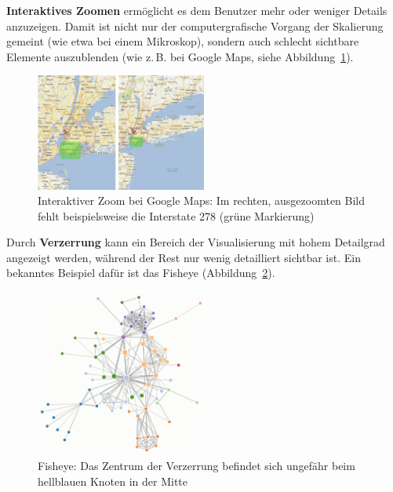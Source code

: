 \documentclass[
	headsepline,
	footsepline,
	fontsize=12pt,
	bibliography=totoc
]{scrbook}
\begin{document}
\textbf{Interaktives Zoomen} ermöglicht es dem Benutzer mehr oder weniger Details anzuzeigen. Damit ist nicht nur der computergrafische Vorgang der Skalierung gemeint (wie etwa bei einem Mikroskop), sondern auch schlecht sichtbare Elemente auszublenden (wie z.\,B. bei Google Maps, siehe Abbildung~\ref{figure:zoom}).

\begin{figure}[htbp]
   \centering
   \includegraphics[width=0.5\textwidth]{images/grundlagen-zoom.png}
   \caption{Interaktiver Zoom bei Google Maps: Im rechten, ausgezoomten Bild fehlt beispielsweise die Interstate 278 (grüne Markierung)}
   \label{figure:zoom}
\end{figure}


Durch \textbf{Verzerrung} kann ein Bereich der Visualisierung mit hohem Detailgrad angezeigt werden, während der Rest nur wenig detailliert sichtbar ist. Ein bekanntes Beispiel dafür ist das Fisheye (Abbildung~\ref{figure:fisheye}).

\begin{figure}[htbp]
   \centering
   \includegraphics[width=0.5\textwidth]{images/grundlagen-fisheye.png}
   \caption{Fisheye: Das Zentrum der Verzerrung befindet sich ungefähr beim hellblauen Knoten in der Mitte}
   \label{figure:fisheye}
\end{figure}

\end{document}

